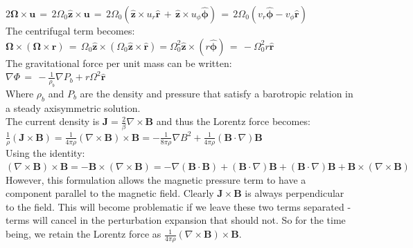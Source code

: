 \documentclass[letterpaper,12pt]{article}
\begin{document}
$2\mathbf{\Omega} \times \mathbf{u} \, = \, 2\Omega_0 \mathbf{\hat{z}} \times \mathbf{u} \, = \, 2\Omega_0\left(\mathbf{\hat{z}} \times u_r \mathbf{\hat{r}} \, + \, \mathbf{\hat{z}} \times u_{\phi} \mathbf{\hat{\phi}}\right) \, = \, 2\Omega_0\left(v_r \mathbf{\hat{\phi}} - v_{\phi}\mathbf{\hat{r}}\right) $\\

The centrifugal term becomes: \\

$\mathbf{\Omega} \times \left(\mathbf{\Omega} \times \mathbf{r} \right) \, = \, \Omega_0 \mathbf{\hat{z}} \times \left(\Omega_0 \mathbf{\hat{z}} \times \mathbf{\hat{r}}\right) = \Omega_0^2 \mathbf{\hat{z}} \times \left(r \mathbf{\hat{\phi}}\right) \, = \, -\Omega_0^2 r \mathbf{\hat{r}}$ \\

The gravitational force per unit mass can be written: \\

$\nabla\Phi \, = \, -\frac{1}{\rho_b}\nabla P_b + r\Omega^2 \mathbf{\hat{r}}$ \\

Where $\rho_b$ and $P_b$ are the density and pressure that satisfy a barotropic relation in a steady axisymmetric solution. \\

The current density is $\mathbf{J} = \frac{2}{\beta} \nabla \times \mathbf{B}$ and thus the Lorentz force becomes: \\

$\frac{1}{\rho} \left(\mathbf{J}\times\mathbf{B}\right) = \frac{1}{4 \pi \rho} \left( \nabla \times \mathbf{B} \right) \times \mathbf{B} = - \frac{1}{8 \pi \rho}\nabla B^2 + \frac{1}{4 \pi \rho} \left(\mathbf{B} \cdot \nabla\right)\mathbf{B}$ \\

Using the identity: \\

$\left( \nabla \times \mathbf{B} \right) \times \mathbf{B} = - \mathbf{B} \times \left( \nabla \times \mathbf{B} \right) = -\nabla \left(\mathbf{B} \cdot \mathbf{B}\right) + \left(\mathbf{B} \cdot \nabla \right)\mathbf{B} + \left(\mathbf{B} \cdot \nabla \right)\mathbf{B} + \mathbf{B} \times \left(\nabla \times \mathbf{B}\right)$ \\

However, this formulation allows the magnetic pressure term to have a component parallel to the magnetic field. Clearly $\mathbf{J} \times \mathbf{B}$ is always perpendicular to the field. This will become problematic if we leave these two terms separated \-- terms will cancel in the perturbation expansion that should not. So for the time being, we retain the Lorentz force as $\frac{1}{4 \pi \rho} \left( \nabla \times \mathbf{B} \right) \times \mathbf{B}$. \\
\end{document}
